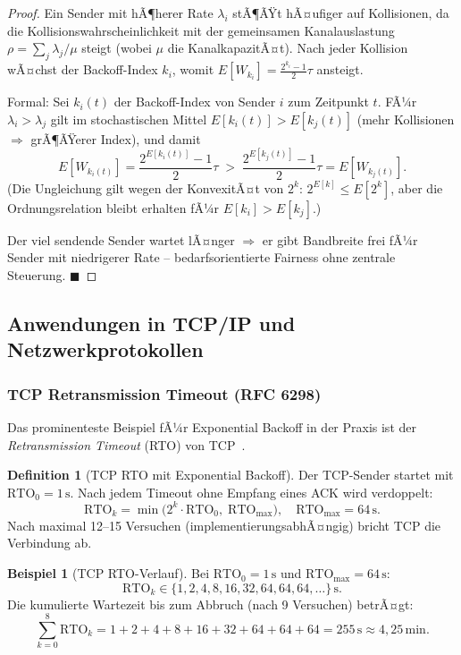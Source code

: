 ﻿\documentclass[a4paper,12pt]{article}
\theoremstyle{definition}
\newtheorem{definition}{Definition}
\newtheorem{beispiel}{Beispiel}
\begin{document}
\begin{proof}
Ein Sender mit hÃ¶herer Rate $\lambda_i$ stÃ¶ÃŸt hÃ¤ufiger auf Kollisionen,
da die Kollisionswahrscheinlichkeit mit der gemeinsamen Kanalauslastung
$\rho = \sum_j \lambda_j / \mu$ steigt (wobei $\mu$ die KanalkapazitÃ¤t).
Nach jeder Kollision wÃ¤chst der Backoff-Index $k_i$, womit
$E[W_{k_i}] = \frac{2^{k_i}-1}{2}\tau$ ansteigt.

Formal: Sei $k_i(t)$ der Backoff-Index von Sender $i$ zum Zeitpunkt $t$.
FÃ¼r $\lambda_i > \lambda_j$ gilt im stochastischen Mittel
$E[k_i(t)] > E[k_j(t)]$ (mehr Kollisionen $\Rightarrow$ grÃ¶ÃŸerer Index),
und damit
\[
  E\!\left[W_{k_i(t)}\right] = \frac{2^{E[k_i(t)]}-1}{2}\tau
  \;>\;
  \frac{2^{E[k_j(t)]}-1}{2}\tau = E\!\left[W_{k_j(t)}\right].
\]
(Die Ungleichung gilt wegen der KonvexitÃ¤t von $2^k$:
$2^{E[k]} \leq E[2^k]$, aber die Ordnungsrelation bleibt erhalten
fÃ¼r $E[k_i] > E[k_j]$.)

Der viel sendende Sender wartet lÃ¤nger $\Rightarrow$ er gibt Bandbreite
frei fÃ¼r Sender mit niedrigerer Rate -- bedarfsorientierte Fairness
ohne zentrale Steuerung.
\hfill$\blacksquare$
\end{proof}

\subsection{Anwendungen in TCP/IP und Netzwerkprotokollen}

\subsubsection{TCP Retransmission Timeout (RFC 6298)}

Das prominenteste Beispiel fÃ¼r Exponential Backoff in der Praxis ist
der \emph{Retransmission Timeout} (RTO) von TCP~\cite{rfc6298}.

\begin{definition}[TCP RTO mit Exponential Backoff]
Der TCP-Sender startet mit $\mathrm{RTO}_0 = 1\,\mathrm{s}$.
Nach jedem Timeout ohne Empfang eines ACK wird verdoppelt:
\[
  \mathrm{RTO}_k = \min\bigl(2^k \cdot \mathrm{RTO}_0,\;
                              \mathrm{RTO}_{\max}\bigr),
  \quad \mathrm{RTO}_{\max} = 64\,\mathrm{s}.
\]
Nach maximal 12--15 Versuchen (implementierungsabhÃ¤ngig) bricht TCP
die Verbindung ab.
\end{definition}

\begin{beispiel}[TCP RTO-Verlauf]
Bei $\mathrm{RTO}_0 = 1\,\mathrm{s}$ und $\mathrm{RTO}_{\max} = 64\,\mathrm{s}$:
\[
  \mathrm{RTO}_k \in \{1, 2, 4, 8, 16, 32, 64, 64, 64, \ldots\}\,\mathrm{s}.
\]
Die kumulierte Wartezeit bis zum Abbruch (nach 9 Versuchen) betrÃ¤gt:
\[
  \sum_{k=0}^{8} \mathrm{RTO}_k = 1+2+4+8+16+32+64+64+64 = 255\,\mathrm{s}
  \approx 4{,}25\,\mathrm{min}.
\]
\end{beispiel}
\end{document}
